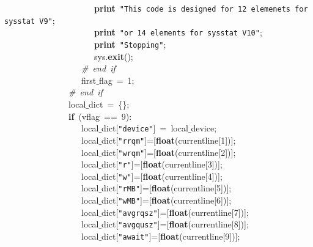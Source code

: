 \mbox{}\ \ \ \ \ \ \ \ \ \ \ \ \ \ \ \ \ \ \ \ \ \textbf{print}\ \texttt{"{}This\ code\ is\ designed\ for\ 12\ elemenets\ for\ sysstat\ V9"{}}; \\
\mbox{}\ \ \ \ \ \ \ \ \ \ \ \ \ \ \ \ \ \ \ \ \ \textbf{print}\ \texttt{"{}or\ 14\ elements\ for\ sysstat\ V10"{}}; \\
\mbox{}\ \ \ \ \ \ \ \ \ \ \ \ \ \ \ \ \ \ \ \ \ \textbf{print}\ \texttt{"{}Stopping"{}}; \\
\mbox{}\ \ \ \ \ \ \ \ \ \ \ \ \ \ \ \ \ \ \ \ \ sys.\textbf{exit}(); \\
\mbox{}\ \ \ \ \ \ \ \ \ \ \ \ \ \ \ \ \ \ \textit{\#\ end\ if} \\
\mbox{}\ \ \ \ \ \ \ \ \ \ \ \ \ \ \ \ \ \ first$\_$flag\ =\ 1; \\
\mbox{}\ \ \ \ \ \ \ \ \ \ \ \ \ \ \ \textit{\#\ end\ if} \\
\mbox{}\ \ \ \ \ \ \ \ \ \ \ \ \ \ \ local$\_$dict\ =\ \{\}; \\
\mbox{}\ \ \ \ \ \ \ \ \ \ \ \ \ \ \ \textbf{if}\ (vflag\ ==\ 9): \\
\mbox{}\ \ \ \ \ \ \ \ \ \ \ \ \ \ \ \ \ \ local$\_$dict[\texttt{"{}device"{}}]\ =\ local$\_$device; \\
\mbox{}\ \ \ \ \ \ \ \ \ \ \ \ \ \ \ \ \ \ local$\_$dict[\texttt{"{}rrqm"{}}]=[\textbf{float}(currentline[1])]; \\
\mbox{}\ \ \ \ \ \ \ \ \ \ \ \ \ \ \ \ \ \ local$\_$dict[\texttt{"{}wrqm"{}}]=[\textbf{float}(currentline[2])]; \\
\mbox{}\ \ \ \ \ \ \ \ \ \ \ \ \ \ \ \ \ \ local$\_$dict[\texttt{"{}r"{}}]=[\textbf{float}(currentline[3])];\  \\
\mbox{}\ \ \ \ \ \ \ \ \ \ \ \ \ \ \ \ \ \ local$\_$dict[\texttt{"{}w"{}}]=[\textbf{float}(currentline[4])]; \\
\mbox{}\ \ \ \ \ \ \ \ \ \ \ \ \ \ \ \ \ \ local$\_$dict[\texttt{"{}rMB"{}}]=[\textbf{float}(currentline[5])]; \\
\mbox{}\ \ \ \ \ \ \ \ \ \ \ \ \ \ \ \ \ \ local$\_$dict[\texttt{"{}wMB"{}}]=[\textbf{float}(currentline[6])]; \\
\mbox{}\ \ \ \ \ \ \ \ \ \ \ \ \ \ \ \ \ \ local$\_$dict[\texttt{"{}avgrqsz"{}}]=[\textbf{float}(currentline[7])]; \\
\mbox{}\ \ \ \ \ \ \ \ \ \ \ \ \ \ \ \ \ \ local$\_$dict[\texttt{"{}avgqusz"{}}]=[\textbf{float}(currentline[8])]; \\
\mbox{}\ \ \ \ \ \ \ \ \ \ \ \ \ \ \ \ \ \ local$\_$dict[\texttt{"{}await"{}}]=[\textbf{float}(currentline[9])]; \\
